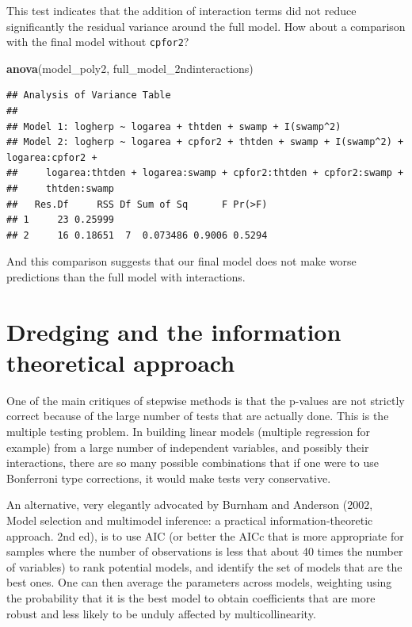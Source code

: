 \documentclass[
  12pt,
]{book}
\newenvironment{Shaded}{\begin{snugshade}}{\end{snugshade}}
\newcommand{\KeywordTok}[1]{\textcolor[rgb]{0.13,0.29,0.53}{\textbf{#1}}}
\newcommand{\NormalTok}[1]{#1}
\begin{document}
This test indicates that the addition of interaction terms did not reduce significantly the residual variance around the full model. How about a comparison with the final model without \texttt{cpfor2}?

\begin{Shaded}
\begin{Highlighting}[]
\KeywordTok{anova}\NormalTok{(model\_poly2, full\_model\_2ndinteractions)}
\end{Highlighting}
\end{Shaded}

\begin{verbatim}
## Analysis of Variance Table
## 
## Model 1: logherp ~ logarea + thtden + swamp + I(swamp^2)
## Model 2: logherp ~ logarea + cpfor2 + thtden + swamp + I(swamp^2) + logarea:cpfor2 + 
##     logarea:thtden + logarea:swamp + cpfor2:thtden + cpfor2:swamp + 
##     thtden:swamp
##   Res.Df     RSS Df Sum of Sq      F Pr(>F)
## 1     23 0.25999                           
## 2     16 0.18651  7  0.073486 0.9006 0.5294
\end{verbatim}

And this comparison suggests that our final model does not make worse predictions than the full model with interactions.

\hypertarget{dredging-and-the-information-theoretical-approach}{%
\section{Dredging and the information theoretical approach}\label{dredging-and-the-information-theoretical-approach}}

One of the main critiques of stepwise methods is that the p-values are not strictly correct because of the large number of tests that are actually done. This is the multiple testing problem. In building linear models (multiple regression for example) from a large number of independent variables, and possibly their interactions, there are so many possible combinations that if one were to use Bonferroni type corrections, it would make tests very conservative.

An alternative, very elegantly advocated by Burnham and Anderson (2002, Model selection and multimodel inference: a practical information-theoretic approach. 2nd ed), is to use AIC (or better the AICc that is more appropriate for samples where the number of observations is less that about 40 times the number of variables) to rank potential models, and identify the set of models that are the best ones. One can then average the parameters across models, weighting using the probability that it is the best model to obtain coefficients that are more robust and less likely to be unduly affected by multicollinearity.
\end{document}
